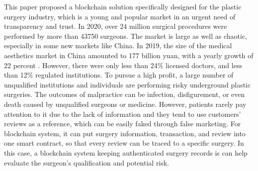 \documentclass{article}
\begin{document}
\par This paper proposed a blockchain solution specifically designed for the plastic surgery industry, which is a young and popular market in an urgent need of transparency and trust. In 2020, over 24 million surgical procedures were performed by more than 43750 surgeons\cite{ISAPS}. The market is large as well as chaotic, especially in some new markets like China. In 2019, the size of the medical aesthetics market in China amounted to 177 billion yuan, with a yearly growth of 22 percent \cite{ChinaMarket}. However, there were only less than 24\% licensed doctors, and less than 12\% regulated institutions\cite{ChinaReport}. To pursue a high profit, a large number of unqualified institutions and individuals are performing risky underground plastic surgeries. The outcomes of malpractice can be infection, disfigurement, or even death caused by unqualified surgeons or medicine. However, patients rarely pay attention to it due to the lack of information and they tend to use customers' reviews as a reference, which can be easily faked through false marketing. For blockchain system, it can put surgery information, transaction, and review into one smart contract, so that every review can be traced to a specific surgery. In this case, a blockchain system keeping authenticated surgery records is can help evaluate the surgeon's qualification and potential risk.  
\end{document}
